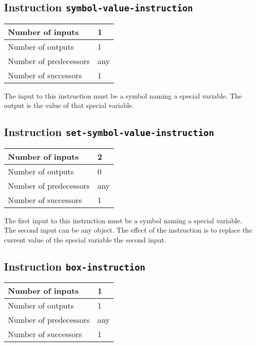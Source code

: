 \subsection{Instruction \texttt{symbol-value-instruction}}
\label{hir-instruction-symbol-value}

\begin{tabular}{|l|l|}
\hline
Number of inputs & 1\\
\hline
Number of outputs & 1\\
\hline
Number of predecessors & any\\
\hline
Number of successors & 1\\
\hline
\end{tabular}

The input to this instruction must be a symbol naming a special
variable.  The output is the value of that special variable.

\subsection{Instruction \texttt{set-symbol-value-instruction}}
\label{hir-instruction-set-symbol-value}

\begin{tabular}{|l|l|}
\hline
Number of inputs & 2\\
\hline
Number of outputs & 0\\
\hline
Number of predecessors & any\\
\hline
Number of successors & 1\\
\hline
\end{tabular}

The first input to this instruction must be a symbol naming a
special variable.  The second input can be any object.  The effect of
the instruction is to replace the current value of the special
variable the second input.

\subsection{Instruction \texttt{box-instruction}}
\label{hir-instruction-box}

\begin{tabular}{|l|l|}
  \hline
  Number of inputs & 1\\
  \hline
  Number of outputs & 1\\
  \hline
  Number of predecessors & any\\
  \hline
  Number of successors & 1\\
  \hline
\end{tabular}

